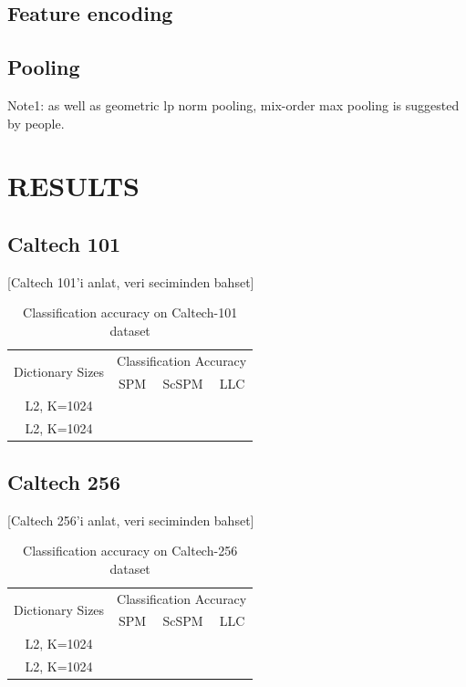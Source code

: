 \documentclass[conference]{IEEEtran}
\begin{document}
\subsection {Feature encoding}

\subsection {Pooling}

Note1: as well as geometric lp norm pooling, mix-order max pooling is suggested by people.

\clearpage

\section{RESULTS}

\subsection{Caltech 101}

[Caltech 101'i anlat, veri seciminden bahset]

\begin{table}[ph]
  \centering
  \begin{tabular}{|c|c|c|c|}
    \hline
    \multirow{2}{*}{Dictionary Sizes} & \multicolumn{3}{c|}{Classification Accuracy} \\
    \cline{2-4}
    & SPM & ScSPM & LLC \\
    \hline
     L2, K=1024 & & & \\
    \hline
     L2, K=1024 & & & \\
    \hline
  \end{tabular}
  \caption{Classification accuracy on Caltech-101 dataset }
  \label{tablo}
\end{table}

\subsection{Caltech 256} 

[Caltech 256'i anlat, veri seciminden bahset]

\begin{table}[ph]
  \centering
  \begin{tabular}{|c|c|c|c|}
    \hline
    \multirow{2}{*}{Dictionary Sizes} & \multicolumn{3}{c|}{Classification Accuracy} \\
    \cline{2-4}
    & SPM & ScSPM & LLC \\
    \hline
     L2, K=1024 & & & \\
    \hline
     L2, K=1024 & & & \\
    \hline
  \end{tabular}
  \caption{Classification accuracy on Caltech-256 dataset }
  \label{tablo}
\end{table}
\end{document}
